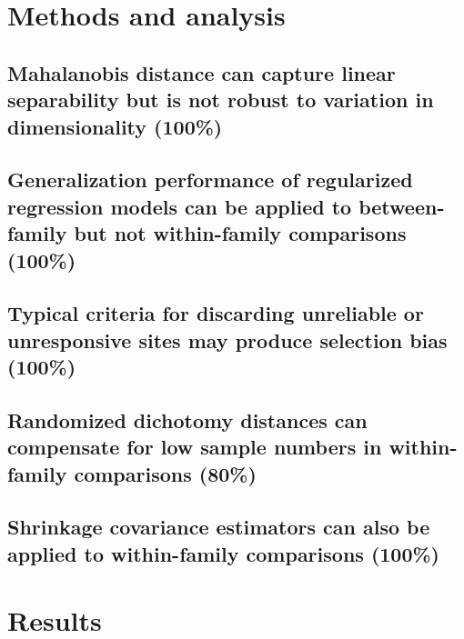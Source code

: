 \documentclass[
  11pt,
  letterpaper,
  DIV=11,
  numbers=noendperiod]{scrartcl}
\begin{document}
\pagebreak

\section{Methods and analysis}\label{methods-and-analysis}

\subsection{Mahalanobis distance can capture linear separability but is
not robust to variation in dimensionality
(100\%)}\label{mahalanobis-distance-can-capture-linear-separability-but-is-not-robust-to-variation-in-dimensionality-100}

\subsection{Generalization performance of regularized regression models
can be applied to between-family but not within-family comparisons
(100\%)}\label{generalization-performance-of-regularized-regression-models-can-be-applied-to-between-family-but-not-within-family-comparisons-100}

\subsection{Typical criteria for discarding unreliable or unresponsive
sites may produce selection bias
(100\%)}\label{typical-criteria-for-discarding-unreliable-or-unresponsive-sites-may-produce-selection-bias-100}

\subsection{Randomized dichotomy distances can compensate for low sample
numbers in within-family comparisons
(80\%)}\label{randomized-dichotomy-distances-can-compensate-for-low-sample-numbers-in-within-family-comparisons-80}

\subsection{Shrinkage covariance estimators can also be applied to
within-family comparisons
(100\%)}\label{shrinkage-covariance-estimators-can-also-be-applied-to-within-family-comparisons-100}

\pagebreak

\section{Results}\label{results}
\end{document}
